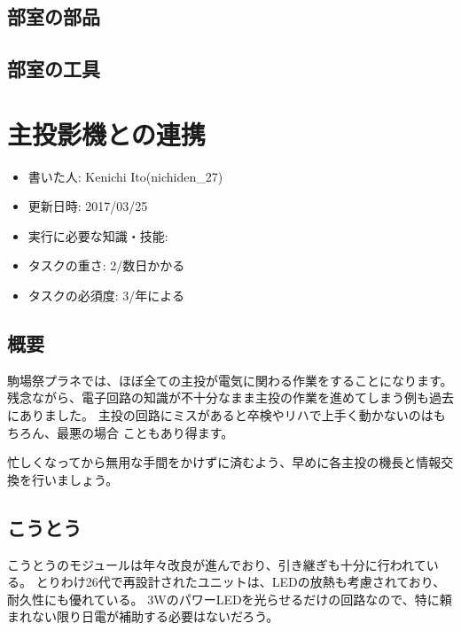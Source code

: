 \documentclass[letterpaper,10pt,dvipdfmx]{sphinxmanual}
\begin{document}
\section{部室の部品}
\label{\detokenize{bihin:id4}}

\section{部室の工具}
\label{\detokenize{bihin:id5}}

\chapter{主投影機との連携}
\label{\detokenize{syutou::doc}}\label{\detokenize{syutou:id1}}\begin{itemize}
\item {} 
書いた人: Kenichi Ito(nichiden\_27)

\item {} 
更新日時: 2017/03/25

\item {} 
実行に必要な知識・技能:

\item {} 
タスクの重さ: 2/数日かかる

\item {} 
タスクの必須度: 3/年による

\end{itemize}


\section{概要}
\label{\detokenize{syutou:id2}}
駒場祭プラネでは、ほぼ全ての主投が電気に関わる作業をすることになります。
残念ながら、電子回路の知識が不十分なまま主投の作業を進めてしまう例も過去にありました。
主投の回路にミスがあると卒検やリハで上手く動かないのはもちろん、最悪の場合
こともあり得ます。

忙しくなってから無用な手間をかけずに済むよう、早めに各主投の機長と情報交換を行いましょう。


\section{こうとう}
\label{\detokenize{syutou:id3}}
こうとうのモジュールは年々改良が進んでおり、引き継ぎも十分に行われている。
とりわけ26代で再設計されたユニットは、LEDの放熱も考慮されており、耐久性にも優れている。
3WのパワーLEDを光らせるだけの回路なので、特に頼まれない限り日電が補助する必要はないだろう。
\end{document}
